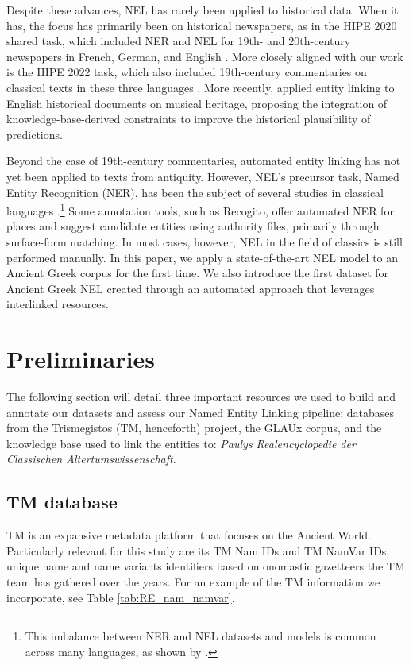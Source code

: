 \documentclass[final]{anthology-ch}
\begin{document}
Despite these advances, NEL has rarely been applied to historical data. When it has, the focus has primarily been on historical newspapers, as in the HIPE 2020 shared task, which included NER and NEL for 19th- and 20th-century newspapers in French, German, and English \cite{Ehrmann_Romanello_Flückiger_Clematide_2020, franke-maier_named_2021}. More closely aligned with our work is the HIPE 2022 task, which also included 19th-century commentaries on classical texts in these three languages \cite{Ehrmann_Romanello_Najem-Meyer_Doucet_Clematide_2022}. More recently, \textcite{graciotti_musical_2025} applied entity linking to English historical documents on musical heritage, proposing the integration of knowledge-base-derived constraints to improve the historical plausibility of predictions.

Beyond the case of 19th-century commentaries, automated entity linking has not yet been applied to texts from antiquity. However, NEL’s precursor task, Named Entity Recognition (NER), has been the subject of several studies in classical languages \cite{Palladino_Yousef_2024, Erdmann_Brown_Joseph_Janse_Ajaka_Elsner_2016, Chastang_Aguilar_Tannier_2021}.\footnote{This imbalance between NER and NEL datasets and models is common across many languages, as shown by \textcite{guellil_entity_2024}.} Some annotation tools, such as Recogito, offer automated NER for places and suggest candidate entities using authority files, primarily through surface-form matching. In most cases, however, NEL in the field of classics is still performed manually.
In this paper, we apply a state-of-the-art NEL model to an Ancient Greek corpus for the first time. We also introduce the first dataset for Ancient Greek NEL created through an automated approach that leverages interlinked resources.

\section{Preliminaries} \label{sec:prelim}
The following section will detail three important resources we used to build and annotate our datasets and assess our Named Entity Linking pipeline: databases from the Trismegistos (TM, henceforth) project, the GLAUx corpus, and the knowledge base used to link the entities to: \textit{Paulys Realencyclopedie der Classischen Altertumswissenschaft}.

\subsection{TM database} \label{sec:TM}
TM is an expansive metadata platform that focuses on the Ancient World. Particularly relevant for this study are its TM Nam IDs and TM NamVar IDs, unique name and name variants identifiers based on onomastic gazetteers the TM team has gathered over the years. For an example of the TM information we incorporate, see Table \ref{tab:RE_nam_namvar}.
\end{document}
